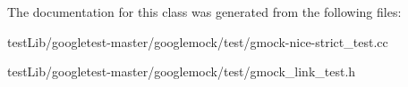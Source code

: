 The documentation for this class was generated from the following files\+:\begin{DoxyCompactItemize}
\item 
test\+Lib/googletest-\/master/googlemock/test/gmock-\/nice-\/strict\+\_\+test.\+cc\item 
test\+Lib/googletest-\/master/googlemock/test/gmock\+\_\+link\+\_\+test.\+h\end{DoxyCompactItemize}
